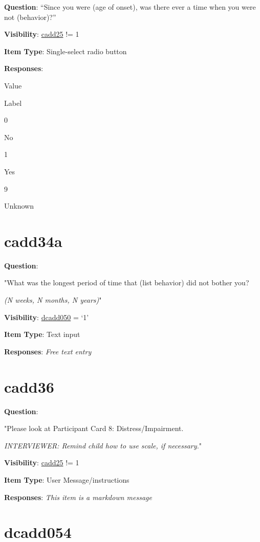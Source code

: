 \documentclass[]{book}
\begin{document}
\textbf{Question}: ``Since you were (age of onset), was there ever a time when you were not (behavior)?''

\textbf{Visibility}: \protect\hyperlink{cadd25}{cadd25} != 1

\textbf{Item Type}: Single-select radio button

\textbf{Responses}:

Value

Label

0

No

1

Yes

9

Unknown

\hypertarget{cadd34a}{%
\section{cadd34a}\label{cadd34a}}

\textbf{Question}:

"What was the longest period of time that (list behavior) did not bother you?

\emph{(N weeks, N months, N years)}"

\textbf{Visibility}: \protect\hyperlink{dcadd050}{dcadd050} = `1'

\textbf{Item Type}: Text input

\textbf{Responses}: \emph{Free text entry}

\hypertarget{cadd36}{%
\section{cadd36}\label{cadd36}}

\textbf{Question}:

"Please look at Participant Card 8: Distress/Impairment.

\emph{INTERVIEWER: Remind child how to use scale, if necessary.}"

\textbf{Visibility}: \protect\hyperlink{cadd25}{cadd25} != 1

\textbf{Item Type}: User Message/instructions

\textbf{Responses}: \emph{This item is a markdown message}

\hypertarget{dcadd054}{%
\section{dcadd054}\label{dcadd054}}
\end{document}
